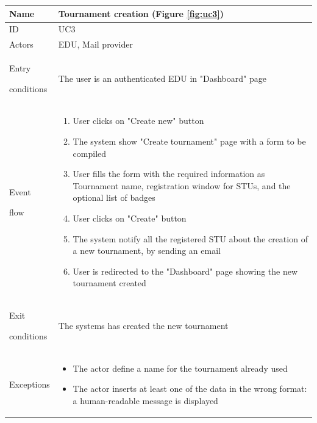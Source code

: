 \begin{center}
    \def\arraystretch{1.5}
    \begin{tabular}{| m{2cm} | m{10cm}|}
        \hline
        Name                  & Tournament creation  (Figure \ref{fig:uc3}) \\ \hline
        ID                    & UC3                                         \\ \hline
        Actors                & EDU, Mail provider                          \\ \hline
        Entry \par conditions & The user is an authenticated EDU in "Dashboard" page                                          \\ \hline
        Event \par flow       & \begin{enumerate}
                                    \item User clicks on "Create new" button
                                    \item The system show "Create tournament" page with a form to be compiled
                                    \item User fills the form with the required information as Tournament name, registration window for STUs, and the optional list of badges
                                    \item User clicks on "Create" button
                                    \item The system notify all the registered STU about the creation of a new tournament, by sending an email
                                    \item User is redirected to the "Dashboard" page showing the new tournament created
                                \end{enumerate}                            \\ \hline
        Exit \par conditions  & The systems has created the new tournament\\ \hline
        Exceptions            & \begin{itemize}
                                    \item The actor define a name for the tournament already used
                                    \item The actor inserts at least one of the data in the wrong format: a human-readable message is displayed

\end{itemize}
\end{tabular}
\end{center}
